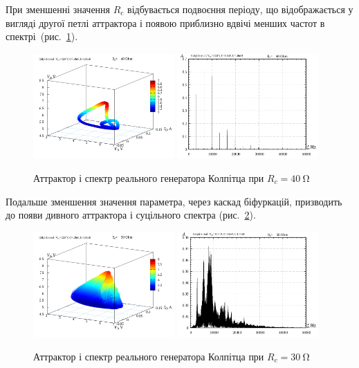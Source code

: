 При зменшенні значення
$ R_c $ відбувається подвоєння періоду, що відображається у вигляді
другої петлі аттрактора і появою приблизно вдвічі менших частот
в спектрі~(рис.~\ref{atu:f:colp_r_attr_f_40}).

\begin{figure}[htb!]
  \centerline{
    \includegraphics[width=0.48\textwidth]{p/r/v1iv2_040000.png}
    \hfill
    \includegraphics[width=0.48\textwidth]{p/r/f_040000.png}
  }
\caption{Аттрактор і спектр реального генератора Колпітца при $ R_c = \SI{40}{\ohm} $}
\label{atu:f:colp_r_attr_f_40}
\end{figure}

Подальше зменшення значення параметра, через каскад біфуркацій,
призводить до появи дивного аттрактора і суцільного спектра
(рис.~\ref{atu:f:colp_r_attr_f_30}).

\begin{figure}[htb!]
  \centerline{
    \includegraphics[width=0.48\textwidth]{p/r/v1iv2_030000.png}
    \hfill
    \includegraphics[width=0.48\textwidth]{p/r/f_030000.png}
  }
\caption{Аттрактор і спектр реального генератора Колпітца при $ R_c = \SI{30}{\ohm} $}
\label{atu:f:colp_r_attr_f_30}
\end{figure}

